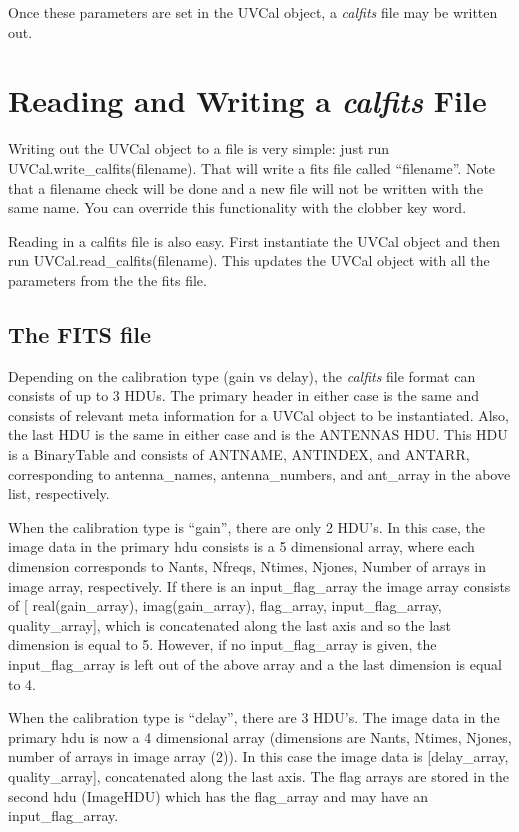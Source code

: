 \documentclass[11pt, oneside]{article}   	%
\begin{document}
Once these parameters are set in the UVCal object, a \textit{calfits} file may
be written out.

\section{Reading and Writing a \textit{calfits} File}
Writing out the UVCal object to a file is very simple: just run
UVCal.write\_calfits(filename). That will write a fits file called
``filename''. Note that a filename check will be done and a new file will not be
written with the same name. You can override this functionality with the clobber
key word.

Reading in a calfits file is also easy. First instantiate the UVCal object and
then run UVCal.read\_calfits(filename). This updates the UVCal object with all
the parameters from the the fits file.

\subsection{The FITS file}
Depending on the calibration type (gain vs delay), the \textit{calfits} file
format can consists of up to 3 HDUs. The primary header in either case is the
same and consists of relevant meta information for a UVCal object to be
instantiated. Also, the last HDU is the same in either case and is the ANTENNAS
HDU. This HDU is a BinaryTable and consists of ANTNAME, ANTINDEX, and ANTARR,
corresponding to antenna\_names, antenna\_numbers, and ant\_array in the above
list, respectively.

When the calibration type is ``gain'', there are only 2 HDU's. In this case, the
image data in the primary hdu consists is a 5 dimensional array, where each
dimension corresponds to Nants, Nfreqs, Ntimes, Njones, Number of arrays in
image array, respectively. If there is an input\_flag\_array the image array
consists of [ real(gain\_array), imag(gain\_array), flag\_array,
input\_flag\_array, quality\_array], which is concatenated along the last axis
and so the last dimension is equal to 5. However, if no input\_flag\_array is
given, the input\_flag\_array is left out of the above array and a the last
dimension is equal to 4.

When the calibration type is ``delay'', there are 3 HDU's. The image data in the
primary hdu is now a 4 dimensional array (dimensions are Nants, Ntimes, Njones,
number of arrays in image array (2)). In this case the image data is
[delay\_array, quality\_array], concatenated along the last axis. The flag
arrays are stored in the second hdu (ImageHDU) which has the flag\_array and may
have an input\_flag\_array.
\end{document}

